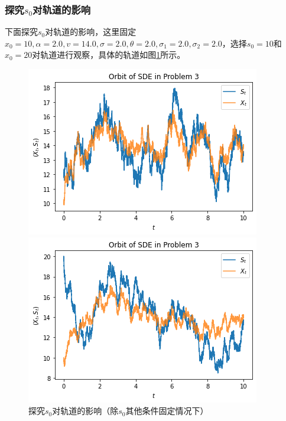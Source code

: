 \documentclass{article}
\begin{document}
\subsubsection{探究$s_0$对轨道的影响}

下面探究$s_0$对轨道的影响，这里固定$x_0 = 10,\alpha = 2.0, v = 14.0, \sigma = 2.0, \theta = 2.0, \sigma_1 =  2.0, \sigma_2 = 2.0$，选择$s_0 = 10$和$x_0 = 20$对轨道进行观察，具体的轨道如图\ref{fig:SDE2s0}所示。 

\begin{figure}[H]
    \centering
    \begin{minipage}[c]{0.48\textwidth}
        \centering
        \includegraphics[height=0.2\textheight]{figures/SDE2 Orbit1.png}
    \end{minipage}
    \begin{minipage}[c]{0.48\textwidth}
        \centering
        \includegraphics[height=0.2\textheight]{figures/SDE2 Orbit2.png}
    \end{minipage}
    \caption{探究$s_0$对轨道的影响（除$s_0$其他条件固定情况下）}
    \label{fig:SDE2s0}
\end{figure}
\end{document}
